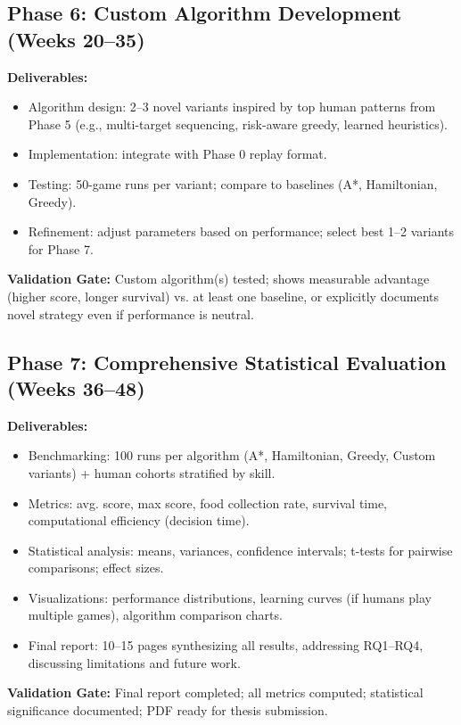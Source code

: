 \documentclass[a4paper]{article}
\begin{document}
\subsection{Phase 6: Custom Algorithm Development (Weeks 20--35)}

\textbf{Deliverables:}
\begin{itemize}
\item Algorithm design: 2--3 novel variants inspired by top human patterns from Phase 5 (e.g., multi-target sequencing, risk-aware greedy, learned heuristics).
\item Implementation: integrate with Phase 0 replay format.
\item Testing: 50-game runs per variant; compare to baselines (A*, Hamiltonian, Greedy).
\item Refinement: adjust parameters based on performance; select best 1--2 variants for Phase 7.
\end{itemize}

\textbf{Validation Gate:} Custom algorithm(s) tested; shows measurable advantage (higher score, longer survival) vs. at least one baseline, or explicitly documents novel strategy even if performance is neutral.

\subsection{Phase 7: Comprehensive Statistical Evaluation (Weeks 36--48)}

\textbf{Deliverables:}
\begin{itemize}
\item Benchmarking: 100 runs per algorithm (A*, Hamiltonian, Greedy, Custom variants) + human cohorts stratified by skill.
\item Metrics: avg. score, max score, food collection rate, survival time, computational efficiency (decision time).
\item Statistical analysis: means, variances, confidence intervals; t-tests for pairwise comparisons; effect sizes.
\item Visualizations: performance distributions, learning curves (if humans play multiple games), algorithm comparison charts.
\item Final report: 10--15 pages synthesizing all results, addressing RQ1--RQ4, discussing limitations and future work.
\end{itemize}

\textbf{Validation Gate:} Final report completed; all metrics computed; statistical significance documented; PDF ready for thesis submission.
\end{document}
